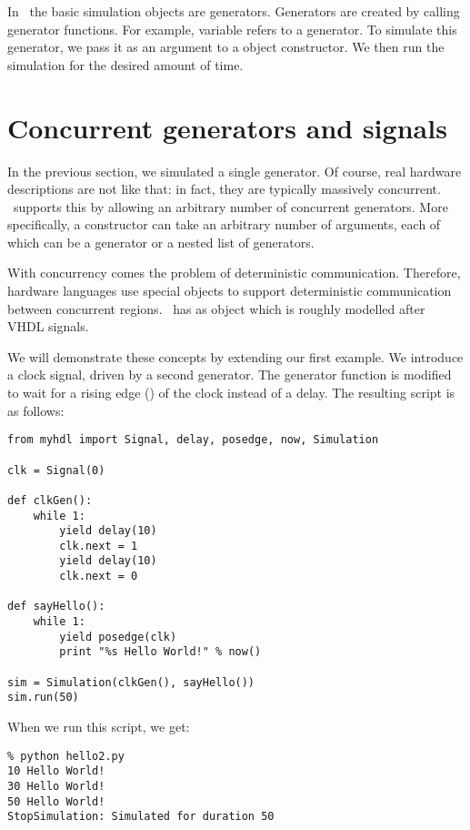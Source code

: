 In \myhdl\, the basic simulation objects are generators. Generators
are created by calling generator functions. For example, variable
 refers to a generator. To simulate this generator, we pass
it as an argument to a  object constructor.  We then
run the simulation for the desired amount of time.


\section{Concurrent generators and signals}

In the previous section, we simulated a single generator. Of course,
real hardware descriptions are not like that: in fact, they are
typically massively concurrent. \myhdl\ supports this by allowing an
arbitrary number of concurrent generators. More specifically, a
 constructor can take an arbitrary number of
arguments, each of which can be a generator or a nested list of
generators.

With concurrency comes the problem of deterministic
communication. Therefore, hardware languages use special objects to
support deterministic communication between concurrent
regions. \myhdl\ has as  object which is roughly modelled
after VHDL signals.

We will demonstrate these concepts by extending our first example. We
introduce a clock signal, driven by a second generator. The
 generator function is modified to wait for a rising
edge () of the clock instead of a delay. The resulting
script is as follows:

\begin{verbatim}
from myhdl import Signal, delay, posedge, now, Simulation

clk = Signal(0)

def clkGen():
    while 1:
        yield delay(10)
        clk.next = 1
        yield delay(10)
        clk.next = 0

def sayHello():
    while 1:
        yield posedge(clk)
        print "%s Hello World!" % now()

sim = Simulation(clkGen(), sayHello())
sim.run(50)

\end{verbatim}

When we run this script, we get:

\begin{verbatim}
% python hello2.py
10 Hello World!
30 Hello World!
50 Hello World!
StopSimulation: Simulated for duration 50

\end{verbatim}

